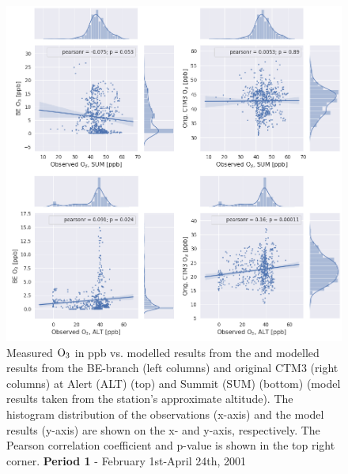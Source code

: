 \begin{figure}[ht]
    \centering
    \includegraphics[width = \linewidth]{Chapter6_Results/images/Orig_BE_comp/jointplot_FebApr_ALTSUM_O3_2001.png}
    \caption{Measured $\mathrm{O_3}$ in ppb vs. modelled results from the and modelled results from the BE-branch (left columns) and original CTM3 (right columns) at  Alert (ALT) (top) and Summit (SUM) (bottom) (model results taken from the station's approximate altitude). The histogram distribution of the observations (x-axis) and the model results (y-axis) are shown on the x- and y-axis, respectively. The Pearson correlation coefficient and p-value is shown in the top right corner. \textbf{Period 1} - February 1st-April 24th, 2001}
    \label{fig:joint_FebApr_ALTSUM}
\end{figure}